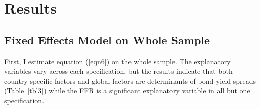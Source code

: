 \documentclass[12pt]{article}
\begin{document}
\section{Results}
\label{section:results}
\subsection{Fixed Effects Model on Whole Sample}
First, I estimate equation (\ref{eqn6}) on the whole sample. The explanatory variables vary across each specification, but the results indicate that both country-specific factors and global factors are determinants of bond yield spreads (Table~\ref{tbl3}) while the FFR is a significant explanatory variable in all but one specification.
\end{document}
